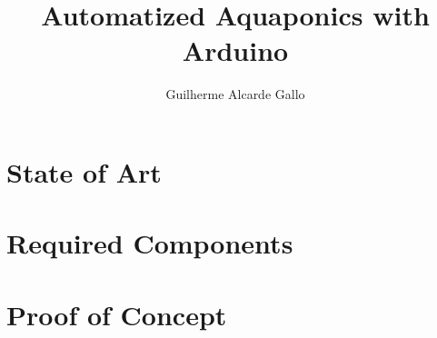 \documentclass[11pt,a4paper]{article}
\title{Automatized Aquaponics with Arduino}
\author{Guilherme Alcarde Gallo}
\begin{document}
\section{State of Art}
\label{sec:state_of_art}



\section{Required Components}
\label{sec:required_components}



\section{Proof of Concept}
\label{sec:proof_of_concept}



\printbibliography
\end{document}
